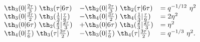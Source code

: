 \begin{equation}
    \begin{array}{lll}
\th_3(0|{2\tau\over 3})~\th_3(\tau|6\tau) &-\th_2(0|{2\tau\over
  3})~\th_2(\tau|6\tau) &= q^{-1/12}~\eta^2 \\
\th_3(0|{3\tau\over 2})~\th_3({1\over 3}|{\tau\over 6})
 & -\th_4(0|{3\tau\over 2})~\th_4({1\over 3}|{\tau\over 6}) &= 2\eta^2 \\  
\th_3(0|6\tau)~\th_2({2\over 3}|{2\tau\over 3})
 &+ \th_3(0|6\tau)~\th_3({2\over 3}|{2\tau\over 3})&= \eta^2 \\ 
\th_4(0|{\tau\over 6})~\th_3(\tau|{3\tau\over 2})
&-\th_3(0|{\tau\over 6})~\th_4(\tau|{3\tau\over 2}) &=q^{-1/3}~\eta^2. 
    \end{array}
  \end{equation}

